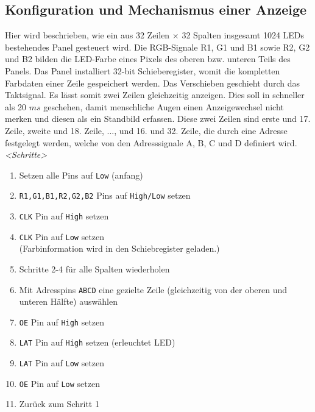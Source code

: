 
\subsection{Konfiguration und Mechanismus einer Anzeige}
Hier wird beschrieben, wie ein aus 32 Zeilen $\times$ 32 Spalten insgesamt 1024 LEDs bestehendes Panel gesteuert wird. Die  RGB-Signale R1, G1 und B1 sowie R2, G2 und B2 bilden die LED-Farbe eines Pixels des oberen bzw. unteren Teils des Panels. Das Panel installiert 32-bit Schieberegister, womit die kompletten Farbdaten einer Zeile gespeichert werden. Das Verschieben geschieht durch das Taktsignal. Es lässt somit zwei Zeilen gleichzeitig anzeigen. Dies soll in schneller als 20 $ms$ geschehen, damit menschliche Augen einen Anzeigewechsel nicht merken und diesen als ein Standbild erfassen. Diese zwei Zeilen sind erste und 17. Zeile, zweite und 18. Zeile, ..., und 16. und 32. Zeile, die durch eine Adresse festgelegt werden, welche von den Adresssignale A, B, C und D definiert wird.\\

\emph{<Schritte>}
\begin{enumerate}
	\item Setzen alle Pins auf \texttt{Low} (anfang)
	\item \texttt{R1,G1,B1,R2,G2,B2} Pins auf \texttt{High/Low} setzen
	\item \texttt{CLK} Pin auf \texttt{High} setzen
	\item \texttt{CLK} Pin auf \texttt{Low} setzen \\
	(Farbinformation wird in den Schiebregister geladen.)
	\item Schritte 2-4 für alle Spalten wiederholen
	\item Mit Adresspins \texttt{ABCD} eine gezielte Zeile (gleichzeitig von der oberen und unteren Hälfte) auswählen
	\item \texttt{OE} Pin auf \texttt{High} setzen
	\item \texttt{LAT} Pin auf \texttt{High} setzen (erleuchtet LED)
	\item \texttt{LAT} Pin auf \texttt{Low} setzen
	\item \texttt{OE} Pin auf \texttt{Low} setzen
	\item Zurück zum Schritt 1
\end{enumerate}

